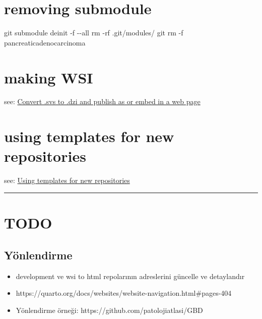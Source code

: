 \documentclass[
  letterpaper,
  DIV=11,
  numbers=noendperiod]{scrreprt}
\newenvironment{Shaded}{}{}
\newcommand{\AttributeTok}[1]{\textcolor[rgb]{0.49,0.56,0.16}{#1}}
\newcommand{\FunctionTok}[1]{\textcolor[rgb]{0.02,0.16,0.49}{#1}}
\newcommand{\NormalTok}[1]{#1}
\providecommand{\tightlist}{%
  \setlength{\itemsep}{0pt}\setlength{\parskip}{0pt}}\usepackage{longtable,booktabs,array}
\begin{document}
\hypertarget{removing-submodule}{%
\chapter{removing submodule}\label{removing-submodule}}

\begin{Shaded}
\begin{Highlighting}[]
\FunctionTok{git}\NormalTok{ submodule deinit }\AttributeTok{{-}f} \AttributeTok{{-}{-}all}
\FunctionTok{rm} \AttributeTok{{-}rf}\NormalTok{ .git/modules/}
\FunctionTok{git}\NormalTok{ rm }\AttributeTok{{-}f}\NormalTok{ pancreaticadenocarcinoma}
\end{Highlighting}
\end{Shaded}

\hypertarget{making-wsi}{%
\chapter{making WSI}\label{making-wsi}}

see:
\href{https://github.com/pathologyatlas/make-html-WSI\#convert-svs-to-dzi-and-publish-as-or-embed-in-a-web-page}{Convert
.svs to .dzi and publish as or embed in a web page}

\hypertarget{using-templates-for-new-repositories}{%
\chapter{using templates for new
repositories}\label{using-templates-for-new-repositories}}

see: \href{https://github.com/pathologyatlas/template}{Using templates
for new repositories}

\begin{center}\rule{0.5\linewidth}{0.5pt}\end{center}

\hypertarget{todo}{%
\chapter{TODO}\label{todo}}

\hypertarget{yuxf6nlendirme}{%
\section{Yönlendirme}\label{yuxf6nlendirme}}

\begin{itemize}
\tightlist
\item
  development ve wsi to html repolarının adreslerini güncelle ve
  detaylandır
\item
  https://quarto.org/docs/websites/website-navigation.html\#pages-404
\item
  Yönlendirme örneği: https://github.com/patolojiatlasi/GBD
\end{itemize}
\end{document}
